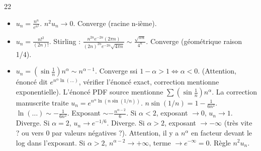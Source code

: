 \begin{correction}{22}
\begin{itemize}
    \item $u_n = \frac{n^n}{e^{n^2}}$. $n^2 u_n \to 0$. Converge (racine n-ième).
    \item $u_n = \frac{n!^2}{(2n)!}$. Stirling : $\frac{n^{2n} e^{-2n} (2\pi n)}{(2n)^{2n} e^{-2n} \sqrt{4\pi n}} \sim \frac{\sqrt{\pi n}}{4^n}$. Converge (géométrique raison 1/4).
    \item $u_n = (\sin \frac{1}{n}) n^\alpha \sim n^{\alpha-1}$. Converge ssi $1-\alpha > 1 \iff \alpha < 0$. (Attention, énoncé dit $e^{n^\alpha \ln(...)}$, vérifier l'énoncé exact, correction mentionne exponentielle).
    L'énoncé PDF source mentionne $\sum (\sin \frac{1}{n}) n^\alpha$.
    La correction manuscrite traite $u_n = e^{n^\alpha \ln(n \sin(1/n))}$.
    $n \sin(1/n) = 1 - \frac{1}{6n^2}$.
    $\ln(\dots) \sim -\frac{1}{6n^2}$.
    Exposant $\sim - \frac{n^{\alpha-2}}{6}$.
    Si $\alpha < 2$, exposant $\to 0$, $u_n \to 1$. Diverge.
    Si $\alpha = 2$, $u_n \to e^{-1/6}$. Diverge.
    Si $\alpha > 2$, exposant $\to -\infty$ (très vite ? ou vers 0 par valeurs négatives ?).
    Attention, il y a $n^\alpha$ en facteur devant le log dans l'exposant.
    Si $\alpha > 2$, $n^{\alpha-2} \to +\infty$, terme $\to e^{-\infty} = 0$.
    Règle $n^2 u_n$.
\end{itemize}
\end{correction}
